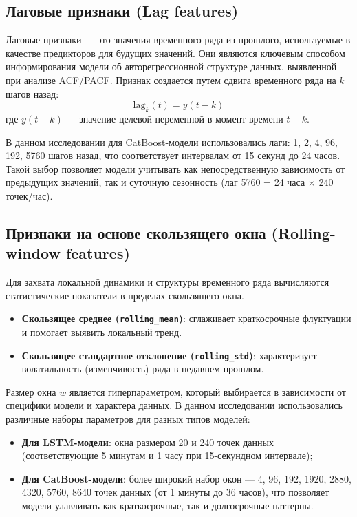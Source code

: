 \subsection{Лаговые признаки (Lag features)}

Лаговые признаки — это значения временного ряда из прошлого, используемые в качестве предикторов для будущих значений. Они являются ключевым способом информирования модели об авторегрессионной структуре данных, выявленной при анализе ACF/PACF. Признак создается путем сдвига временного ряда на $k$ шагов назад:
\begin{equation}
	\text{lag}_k(t) = y(t-k)
\end{equation}
где $y(t-k)$ — значение целевой переменной в момент времени $t-k$.

В данном исследовании для CatBoost-модели использовались лаги: 1, 2, 4, 96, 192, 5760 шагов назад, что соответствует интервалам от 15 секунд до 24 часов. Такой выбор позволяет модели учитывать как непосредственную зависимость от предыдущих значений, так и суточную сезонность (лаг 5760 = 24 часа $\times$ 240 точек/час).

\subsection{Признаки на основе скользящего окна (Rolling-window features)}

Для захвата локальной динамики и структуры временного ряда вычисляются статистические показатели в пределах скользящего окна.

\begin{itemize}
	\item \textbf{Скользящее среднее (\texttt{rolling\_mean})}: сглаживает краткосрочные флуктуации и помогает выявить локальный тренд.
	\item \textbf{Скользящее стандартное отклонение (\texttt{rolling\_std})}: характеризует волатильность (изменчивость) ряда в недавнем прошлом.
\end{itemize}
Размер окна $w$ является гиперпараметром, который выбирается в зависимости от специфики модели и характера данных. В данном исследовании использовались различные наборы параметров для разных типов моделей:

\begin{itemize}
	\item \textbf{Для LSTM-модели}: окна размером 20 и 240 точек данных (соответствующие 5 минутам и 1 часу при 15-секундном интервале);
	\item \textbf{Для CatBoost-модели}: более широкий набор окон --- 4, 96, 192, 1920, 2880, 4320, 5760, 8640 точек данных (от 1 минуты до 36 часов), что позволяет модели улавливать как краткосрочные, так и долгосрочные паттерны.
\end{itemize} 